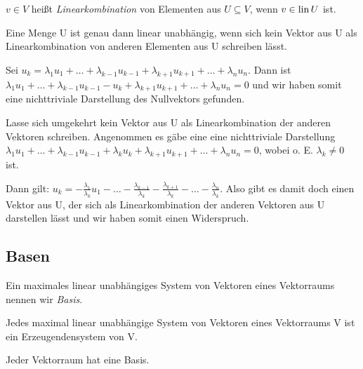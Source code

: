 \documentclass[10pt]{scrbook}
\begin{document}
\begin{Def}
$v\in V$ heißt \emph{Linearkombination} von Elementen aus $U\subseteq V$, wenn $v\in \operatorname{lin} U$ ist.
\end{Def}

\begin{Sa}
Eine Menge U ist genau dann linear unabhängig, wenn sich kein Vektor aus U als Linearkombination von anderen Elementen aus U schreiben lässt.
\end{Sa}
\begin{bew}
Sei $u_k=\lambda_1 u_1+\ldots+\lambda_{k-1} u_{k-1}+\lambda_{k+1} u_{k+1}+\ldots+\lambda_n u_n$. Dann ist $\lambda_1 u_1+\ldots+\lambda_{k-1} u_{k-1}-u_k+\lambda_{k+1} u_{k+1}+\ldots+\lambda_n u_n=0$ und wir haben somit eine nichttriviale Darstellung des Nullvektors gefunden.

Lasse sich umgekehrt kein Vektor aus U als Linearkombination der anderen Vektoren schreiben. Angenommen es gäbe eine eine nichttriviale Darstellung $\lambda_1 u_1+\ldots+\lambda_{k-1} u_{k-1}+\lambda_k u_k+\lambda_{k+1} u_{k+1}+\ldots+\lambda_n u_n=0$, wobei o. E. $\lambda_k\neq 0$ ist.

Dann gilt: $u_k=-\frac{\lambda_1}{\lambda_k} u_1-\ldots-\frac{\lambda_{k-1}}{\lambda_k}-\frac{\lambda_{k+1}}{\lambda_k}-\ldots-\frac{\lambda_n}{\lambda_k}$. Also gibt es damit doch einen Vektor aus U, der sich als Linearkombination der anderen Vektoren aus U darstellen lässt und wir haben somit einen Widerspruch.
\end{bew}

\subsection{Basen}

\begin{Def}
Ein maximales linear unabhängiges System von Vektoren eines Vektorraums nennen wir \emph{Basis}.
\end{Def}

\begin{Sa}
Jedes maximal linear unabhängige System von Vektoren eines Vektorraums V ist ein Erzeugendensystem von V.
\end{Sa}

\begin{Sa}
Jeder Vektorraum hat eine Basis.
\end{Sa}
\end{document}
